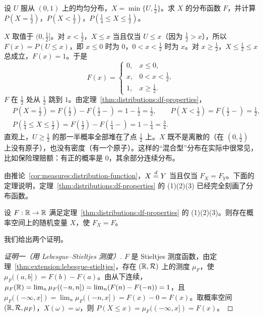 \begin{workedexample}\label{we:distributions:mixed}
设 $U$ 服从 $(0,1)$ 上的均匀分布，$X=\min\{U,\frac12\}$。求 $X$ 的分布函数 $F$，并计算 $P(X=\frac12)$，$P(X<\frac12)$，$P(\frac14\leqslant X\leqslant\frac12)$。
\end{workedexample}
\begin{solution}
$X$ 取值于 $(0,\frac12]$。对 $x<\frac12$，$X\leqslant x$ 当且仅当 $U\leqslant x$（因为 $\frac12>x$），所以 $F(x)=P(U\leqslant x)$，即 $x\leqslant0$ 时为 $0$，$0<x<\frac12$ 时为 $x$。对 $x\geqslant\frac12$，$X\leqslant\frac12\leqslant x$ 总成立，$F(x)=1$。于是
\[
F(x)=\begin{cases}0,&x\leqslant0,\\ x,&0<x<\frac12,\\ 1,&x\geqslant\frac12.\end{cases}
\]
$F$ 在 $\frac12$ 处从 $\frac12$ 跳到 $1$。由定理~\ref{thm:distributions:df-properties}，
\[
\begin{aligned}
&P(X=\tfrac12)=F(\tfrac12)-F(\tfrac12-)=1-\tfrac12=\tfrac12,\qquad P(X<\tfrac12)=F(\tfrac12-)=\tfrac12,\\
&P(\tfrac14\leqslant X\leqslant\tfrac12)=F(\tfrac12)-F(\tfrac14-)=1-\tfrac14=\tfrac34 .
\end{aligned}
\]
直观上，$U\geqslant\frac12$ 的那一半概率全部堆在了点 $\frac12$ 上。$X$ 既不是离散的（在 $(0,\frac12)$ 上没有原子），也没有密度（有一个原子）。这样的“混合型”分布在实际中很常见，比如保险理赔额：有正的概率是 $0$，其余部分连续分布。
\end{solution}

由推论~\ref{cor:measures:distribution-function}，$X\stackrel{d}{=} Y$ 当且仅当 $F_X=F_Y$。下面的定理说明，定理~\ref{thm:distributions:df-properties} 的 (1)(2)(3) 已经完全刻画了分布函数。

\begin{theorem}[分布函数的刻画]\label{thm:distributions:characterization}
设 $F:\mathbb{R}\to\mathbb{R}$ 满足定理~\ref{thm:distributions:df-properties} 的 (1)(2)(3)。则存在概率空间上的随机变量 $X$，使 $F_X=F$。
\end{theorem}

我们给出两个证明。

\begin{proof}[证明一（用 Lebesgue--Stieltjes 测度）]
$F$ 是 Stieltjes 测度函数，由定理~\ref{thm:extension:lebesgue-stieltjes}，存在 $(\mathbb{R},\mathcal{R})$ 上的测度 $\mu_F$，使 $\mu_F((a,b])=F(b)-F(a)$。由从下连续，$\mu_F(\mathbb{R})=\lim_n\mu_F((-n,n])=\lim_n(F(n)-F(-n))=1$，且 $\mu_F((-\infty,x])=\lim_n\mu_F((-n,x])=F(x)-0=F(x)$。取概率空间 $(\mathbb{R},\mathcal{R},\mu_F)$，$X(\omega)=\omega$，则 $P(X\leqslant x)=\mu_F((-\infty,x])=F(x)$。
\end{proof}

